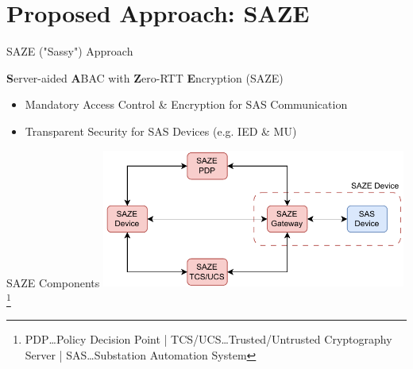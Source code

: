 \documentclass[en]{sdqbeamer}
\newcommand\nonumberfootnote[1]{%
  \begingroup
  \renewcommand\thefootnote{}\footnote{#1}%
  \addtocounter{footnote}{-1}%
  \endgroup
}
\begin{document}
\section{Proposed Approach: SAZE}
\begin{frame}{SAZE ("Sassy") Approach}
    \begin{greenblock}{\textbf{S}erver-aided \textbf{A}BAC with \textbf{Z}ero-RTT \textbf{E}ncryption (SAZE)}
        \begin{itemize}
            \item Mandatory Access Control \& Encryption for SAS Communication
            \item Transparent Security for SAS Devices (e.g. IED \& MU)
        \end{itemize}
    \end{greenblock}
\end{frame}

\begin{frame}{SAZE Components}
    \centering
	\includegraphics[width=0.75\textwidth]{./figures/saze_components_color.drawio.pdf}
    \nonumberfootnote{PDP\dots Policy Decision Point | TCS/UCS\dots Trusted/Untrusted Cryptography Server | SAS\dots Substation Automation System}
\end{frame}
\end{document}
